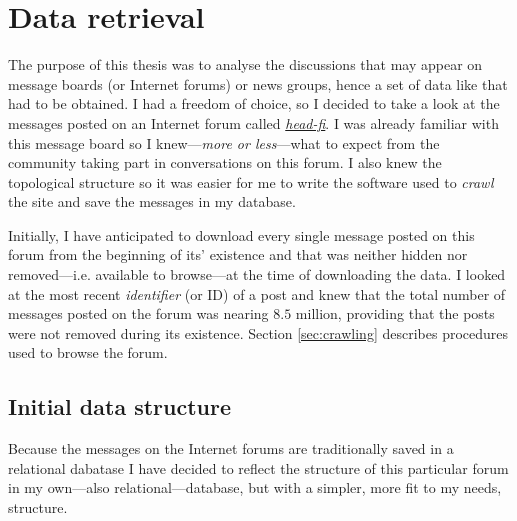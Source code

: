 \section{Data retrieval}

  The purpose of this thesis was to analyse the discussions that may appear on message boards (or Internet forums) or news groups, hence a set of data like that had to be obtained. I had a freedom of choice, so I decided to take a look at the messages posted on an Internet forum called \emph{\href{http://www.head-fi.org/f/}{head-fi}}. I was already familiar with this message board so I knew---\textit{more or less}---what to expect from the community taking part in conversations on this forum. I also knew the topological structure so it was easier for me to write the software used to \emph{crawl} the site and save the messages in my database.
  
  Initially, I have anticipated to download every single message posted on this forum from the beginning of its' existence and that was neither hidden nor removed---i.e. available to browse---at the time of downloading the data. I looked at the most recent \emph{identifier} (or ID) of a post and knew that the total number of messages posted on the forum was nearing $8.5$ million, providing that the posts were not removed during its existence. Section \ref{sec:crawling} describes procedures used to browse the forum.
  
  \subsection{Initial data structure}
    Because the messages on the Internet forums are traditionally saved in a relational dabatase I have decided to reflect the structure of this particular forum in my own---also relational---database, but with a simpler, more fit to my needs, structure.
    
